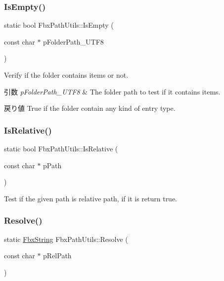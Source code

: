 \subsubsection{\texorpdfstring{Is\+Empty()}{IsEmpty()}}
{\footnotesize\ttfamily static bool Fbx\+Path\+Utils\+::\+Is\+Empty (\begin{DoxyParamCaption}\item[{const char $\ast$}]{p\+Folder\+Path\+\_\+\+U\+T\+F8 }\end{DoxyParamCaption})\hspace{0.3cm}{\ttfamily [static]}}

Verify if the folder contains items or not. 
\begin{DoxyParams}{引数}
{\em p\+Folder\+Path\+\_\+\+U\+T\+F8} & The folder path to test if it contains items. \\
\hline
\end{DoxyParams}
\begin{DoxyReturn}{戻り値}
True if the folder contain any kind of entry type. 
\end{DoxyReturn}
\mbox{\label{class_fbx_path_utils_ad95bc37bf3ed66b0f1d2ab261b238276}} 
\subsubsection{\texorpdfstring{Is\+Relative()}{IsRelative()}}
{\footnotesize\ttfamily static bool Fbx\+Path\+Utils\+::\+Is\+Relative (\begin{DoxyParamCaption}\item[{const char $\ast$}]{p\+Path }\end{DoxyParamCaption})\hspace{0.3cm}{\ttfamily [static]}}



Test if the given path is relative path, if it is return true. 

\mbox{\label{class_fbx_path_utils_a5adc2b4d7bed904ba22f3613f9bb729a}} 
\subsubsection{\texorpdfstring{Resolve()}{Resolve()}}
{\footnotesize\ttfamily static \hyperlink{class_fbx_string}{Fbx\+String} Fbx\+Path\+Utils\+::\+Resolve (\begin{DoxyParamCaption}\item[{const char $\ast$}]{p\+Rel\+Path }\end{DoxyParamCaption})\hspace{0.3cm}{\ttfamily [static]}}

